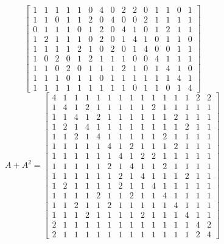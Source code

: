\documentclass[answers]{exam}
\begin{document}
\begin{questions}
\begin{solution}
{\[\begin{bmatrix}
					1 & 1 & 1 & 1 & 1 & 0 & 4 & 0 & 2 & 2 & 0 & 1 & 1 & 0 & 1 \\
					1 & 1 & 0 & 1 & 1 & 2 & 0 & 4 & 0 & 0 & 2 & 1 & 1 & 1 & 1 \\
					0 & 1 & 1 & 1 & 0 & 1 & 2 & 0 & 4 & 1 & 0 & 1 & 2 & 1 & 1 \\
					1 & 2 & 1 & 1 & 1 & 0 & 2 & 0 & 1 & 4 & 1 & 0 & 1 & 1 & 0 \\
					1 & 1 & 1 & 1 & 2 & 1 & 0 & 2 & 0 & 1 & 4 & 0 & 0 & 1 & 1 \\
					1 & 0 & 2 & 0 & 1 & 2 & 1 & 1 & 1 & 0 & 0 & 4 & 1 & 1 & 1 \\
					1 & 1 & 0 & 2 & 0 & 1 & 1 & 1 & 2 & 1 & 0 & 1 & 4 & 1 & 0 \\
					1 & 1 & 1 & 0 & 1 & 1 & 0 & 1 & 1 & 1 & 1 & 1 & 1 & 4 & 1 \\
					1 & 1 & 1 & 1 & 1 & 1 & 1 & 1 & 1 & 0 & 1 & 1 & 0 & 1 & 4 
				\end{bmatrix}
				\]}
				{\setlength{\arraycolsep}{2pt}\[
				A + A^2 = \begin{bmatrix}
				4 & 1 & 1 & 1 & 1 & 1 & 1 & 1 & 1 & 1 & 1 & 1 & 1 & 2 & 2 \\
				1 & 4 & 1 & 2 & 1 & 1 & 1 & 1 & 1 & 2 & 1 & 1 & 1 & 1 & 1 \\
				1 & 1 & 4 & 1 & 2 & 1 & 1 & 1 & 1 & 1 & 1 & 2 & 1 & 1 & 1 \\
				1 & 2 & 1 & 4 & 1 & 1 & 1 & 1 & 1 & 1 & 1 & 1 & 2 & 1 & 1 \\
				1 & 1 & 2 & 1 & 4 & 1 & 1 & 1 & 1 & 1 & 2 & 1 & 1 & 1 & 1 \\
				1 & 1 & 1 & 1 & 1 & 4 & 1 & 2 & 1 & 1 & 1 & 2 & 1 & 1 & 1 \\
				1 & 1 & 1 & 1 & 1 & 1 & 4 & 1 & 2 & 2 & 1 & 1 & 1 & 1 & 1 \\
				1 & 1 & 1 & 1 & 1 & 2 & 1 & 4 & 1 & 1 & 2 & 1 & 1 & 1 & 1 \\
				1 & 1 & 1 & 1 & 1 & 1 & 2 & 1 & 4 & 1 & 1 & 1 & 2 & 1 & 1 \\
				1 & 2 & 1 & 1 & 1 & 1 & 2 & 1 & 1 & 4 & 1 & 1 & 1 & 1 & 1 \\
				1 & 1 & 1 & 1 & 2 & 1 & 1 & 2 & 1 & 1 & 4 & 1 & 1 & 1 & 1 \\
				1 & 1 & 2 & 1 & 1 & 2 & 1 & 1 & 1 & 1 & 1 & 4 & 1 & 1 & 1 \\
				1 & 1 & 1 & 2 & 1 & 1 & 1 & 1 & 2 & 1 & 1 & 1 & 4 & 1 & 1 \\
				2 & 1 & 1 & 1 & 1 & 1 & 1 & 1 & 1 & 1 & 1 & 1 & 1 & 4 & 2 \\
				2 & 1 & 1 & 1 & 1 & 1 & 1 & 1 & 1 & 1 & 1 & 1 & 1 & 2 & 4 
				\end{bmatrix}
				\]}


\end{solution}
\end{questions}
\end{document}
